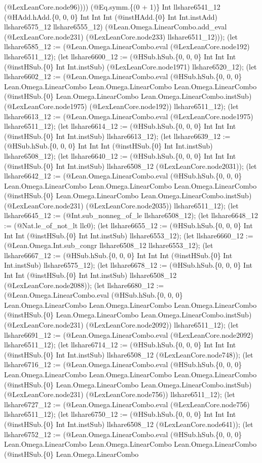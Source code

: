 \documentclass[11pt]{article}
\begin{document}
(@LexLeanCore.node96)))) (@Eq.symm.\{(0 + 1)\} Int llshare6541\_12 (@HAdd.hAdd.\{0, 0, 0\} Int Int Int (@instHAdd.\{0\} Int Int.instAdd) llshare6575\_12 llshare6555\_12) (@Lean.Omega.LinearCombo.add\_eval (@LexLeanCore.node231) (@LexLeanCore.node233) llshare6511\_12))); (let llshare6585\_12 := (@Lean.Omega.LinearCombo.eval (@LexLeanCore.node192) llshare6511\_12); (let llshare6600\_12 := (@HSub.hSub.\{0, 0, 0\} Int Int Int (@instHSub.\{0\} Int Int.instSub) (@LexLeanCore.node1971) llshare6520\_12); (let llshare6602\_12 := (@Lean.Omega.LinearCombo.eval (@HSub.hSub.\{0, 0, 0\} Lean.Omega.LinearCombo Lean.Omega.LinearCombo Lean.Omega.LinearCombo (@instHSub.\{0\} Lean.Omega.LinearCombo Lean.Omega.LinearCombo.instSub) (@LexLeanCore.node1975) (@LexLeanCore.node192)) llshare6511\_12); (let llshare6613\_12 := (@Lean.Omega.LinearCombo.eval (@LexLeanCore.node1975) llshare6511\_12); (let llshare6614\_12 := (@HSub.hSub.\{0, 0, 0\} Int Int Int (@instHSub.\{0\} Int Int.instSub) llshare6613\_12); (let llshare6639\_12 := (@HSub.hSub.\{0, 0, 0\} Int Int Int (@instHSub.\{0\} Int Int.instSub) llshare6508\_12); (let llshare6640\_12 := (@HSub.hSub.\{0, 0, 0\} Int Int Int (@instHSub.\{0\} Int Int.instSub) llshare6508\_12 (@LexLeanCore.node2031)); (let llshare6642\_12 := (@Lean.Omega.LinearCombo.eval (@HSub.hSub.\{0, 0, 0\} Lean.Omega.LinearCombo Lean.Omega.LinearCombo Lean.Omega.LinearCombo (@instHSub.\{0\} Lean.Omega.LinearCombo Lean.Omega.LinearCombo.instSub) (@LexLeanCore.node231) (@LexLeanCore.node2035)) llshare6511\_12); (let llshare6645\_12 := (@Int.sub\_nonneg\_of\_le llshare6508\_12); (let llshare6648\_12 := (@Nat.le\_of\_not\_lt llc0); (let llshare6655\_12 := (@HSub.hSub.\{0, 0, 0\} Int Int Int (@instHSub.\{0\} Int Int.instSub) llshare6553\_12); (let llshare6660\_12 := (@Lean.Omega.Int.sub\_congr llshare6508\_12 llshare6553\_12); (let llshare6667\_12 := (@HSub.hSub.\{0, 0, 0\} Int Int Int (@instHSub.\{0\} Int Int.instSub) llshare6575\_12); (let llshare6678\_12 := (@HSub.hSub.\{0, 0, 0\} Int Int Int (@instHSub.\{0\} Int Int.instSub) llshare6508\_12 (@LexLeanCore.node2088)); (let llshare6680\_12 := (@Lean.Omega.LinearCombo.eval (@HSub.hSub.\{0, 0, 0\} Lean.Omega.LinearCombo Lean.Omega.LinearCombo Lean.Omega.LinearCombo (@instHSub.\{0\} Lean.Omega.LinearCombo Lean.Omega.LinearCombo.instSub) (@LexLeanCore.node231) (@LexLeanCore.node2092)) llshare6511\_12); (let llshare6691\_12 := (@Lean.Omega.LinearCombo.eval (@LexLeanCore.node2092) llshare6511\_12); (let llshare6714\_12 := (@HSub.hSub.\{0, 0, 0\} Int Int Int (@instHSub.\{0\} Int Int.instSub) llshare6508\_12 (@LexLeanCore.node748)); (let llshare6716\_12 := (@Lean.Omega.LinearCombo.eval (@HSub.hSub.\{0, 0, 0\} Lean.Omega.LinearCombo Lean.Omega.LinearCombo Lean.Omega.LinearCombo (@instHSub.\{0\} Lean.Omega.LinearCombo Lean.Omega.LinearCombo.instSub) (@LexLeanCore.node231) (@LexLeanCore.node756)) llshare6511\_12); (let llshare6727\_12 := (@Lean.Omega.LinearCombo.eval (@LexLeanCore.node756) llshare6511\_12); (let llshare6750\_12 := (@HSub.hSub.\{0, 0, 0\} Int Int Int (@instHSub.\{0\} Int Int.instSub) llshare6508\_12 (@LexLeanCore.node641)); (let llshare6752\_12 := (@Lean.Omega.LinearCombo.eval (@HSub.hSub.\{0, 0, 0\} Lean.Omega.LinearCombo Lean.Omega.LinearCombo Lean.Omega.LinearCombo (@instHSub.\{0\} Lean.Omega.LinearCombo 
\end{document}
